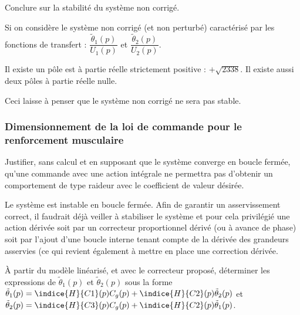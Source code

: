 \documentclass[11pt]{article}
\begin{document}
\UPSTIquestion Conclure sur la stabilité du système non corrigé.

\begin{UPSTIcorrige}

Si on considère le système non corrigé (et non perturbé) caractérisé par les fonctions de transfert : $\dfrac{\tilde{\theta}_1(p)}{U_1(p)}$ et $\dfrac{\tilde{\theta}_2(p)}{U_2(p)}$.

Il existe un pôle est à partie réelle strictement positive : $+\sqrt{2338}$. Il existe aussi deux pôles à partie réelle nulle.

Ceci laisse à penser que le système non corrigé ne sera pas stable.
\end{UPSTIcorrige}

\subsubsection{Dimensionnement de la loi de commande pour le renforcement musculaire}
\UPSTIquestion Justifier, sans calcul et en supposant que le système converge en boucle fermée, qu’une commande avec une action intégrale ne permettra pas d’obtenir un comportement de type raideur avec le coefficient de valeur désirée.

\begin{UPSTIcorrige}
Le système est instable en boucle fermée. Afin de garantir un asservissement correct, il faudrait déjà veiller à stabiliser le système et pour cela privilégié une action dérivée soit par un correcteur proportionnel dérivé (ou à avance de phase) soit par l'ajout d'une boucle interne tenant compte de la dérivée des grandeurs asservies (ce qui revient également à mettre en place une correction dérivée.
\end{UPSTIcorrige}

\UPSTIquestion À partir du modèle linéarisé, et avec le correcteur proposé, déterminer les expressions de
$\tilde{\theta}_1(p)$ et $\tilde{\theta}_2(p)$ sous la forme 
$\tilde{\theta}_1(p)=\indice{H}{C1}(p)C_g(p)+\indice{H}{C2}(p)\tilde{\theta}_2(p)$ et
$\tilde{\theta}_2(p)=\indice{H}{C3}(p)C_g(p)+\indice{H}{C2}(p)\tilde{\theta}_1(p)$.
\end{document}
